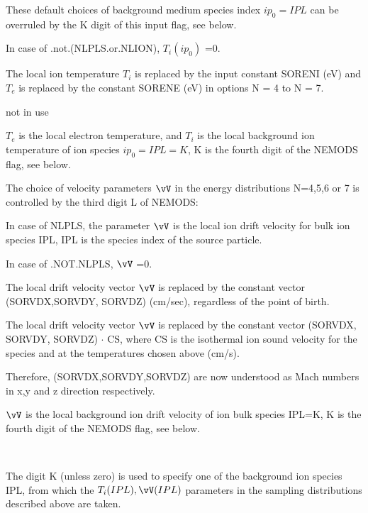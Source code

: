 \begin{list}{ }{}
\begin{list}{ }{}
These default choices of background medium species index $ip_0=IPL$ can be overruled by the K digit of this
input flag, see below.

In case of .not.(NLPLS.or.NLION), $T_i(ip_0)$ =0.
\item[{M =1 }]
The local ion temperature
$T_i$ is replaced by the input constant SORENI (eV) and
$T_e$ is replaced by the constant SORENE (eV) in options
N = 4 to N = 7.
\item[{M =2 }]
not in use
\item[{M =3 }]
$T_e$ is the local electron temperature, and $T_i$ is the local
background ion temperature of ion species $ip_0 = IPL=K$, K is the fourth digit
of the NEMODS flag, see below.

\end{list}
The choice of velocity parameters $\vV$ in the energy distributions
N=4,5,6 or 7 is controlled by the third digit L of NEMODS:
\begin{list}{ }{}
\item[{L =0 }]
In case of NLPLS, the parameter $\vV$ is the local ion drift velocity
for bulk ion species IPL, IPL is the species index of the source particle.

In case of .NOT.NLPLS, $\vV$ =0.
\item[{L =1 }]
The local drift velocity vector
$\vV $ is replaced by the constant vector (SORVDX,SORVDY,
SORVDZ) (cm/sec), regardless of the point of birth.

\item[{L =2 }]
The local drift velocity vector
$\vV $ is replaced by the constant vector
(SORVDX, SORVDY, SORVDZ) $ \cdot $ CS, where CS is the isothermal ion sound
velocity for the species and at the temperatures
chosen above (cm/s).

Therefore, { (SORVDX,SORVDY,SORVDZ) }
are now understood as Mach numbers in x,y and z direction
respectively.
\item[{L =3 }]
$\vV$ is the local
background ion drift velocity of ion bulk species IPL=K, K is the fourth digit
of the NEMODS flag, see below.

\item[{K options }] ~

The digit K (unless zero) is used to specify one of the
background ion species IPL, from which the $T_i(IPL), \vV(IPL) $
parameters in the sampling distributions described above are taken.

\end{list}
\item[{\bf SORCOS, SORMAX }]~


\end{list}

